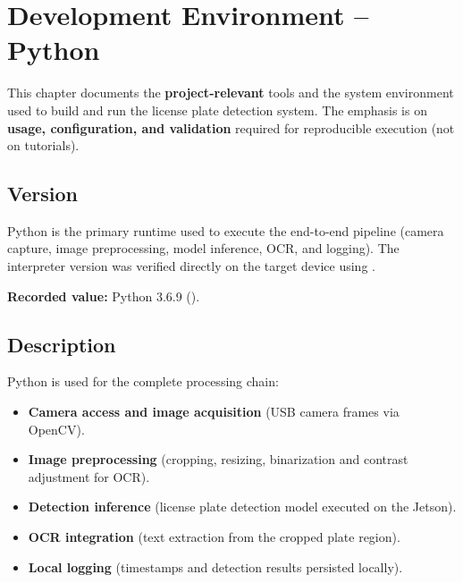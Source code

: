 %
%
%

\chapter{Development Environment -- Python}

\noindent
This chapter documents the \textbf{project-relevant} tools and the system environment used to build and run the license plate detection system.
The emphasis is on \textbf{usage, configuration, and validation} required for reproducible execution (not on tutorials).

\section{Version}
\noindent
Python is the primary runtime used to execute the end-to-end pipeline (camera capture, image preprocessing, model inference, OCR, and logging).
The interpreter version was verified directly on the target device using .

\vspace{1mm}
\noindent
\textbf{Recorded value:} Python 3.6.9 ().

\section{Description}
\noindent
Python is used for the complete processing chain:
\begin{itemize}
	\item \textbf{Camera access and image acquisition} (USB camera frames via OpenCV).
	\item \textbf{Image preprocessing} (cropping, resizing, binarization and contrast adjustment for OCR).
	\item \textbf{Detection inference} (license plate detection model executed on the Jetson).
	\item \textbf{OCR integration} (text extraction from the cropped plate region).
	\item \textbf{Local logging} (timestamps and detection results persisted locally).
\end{itemize}

